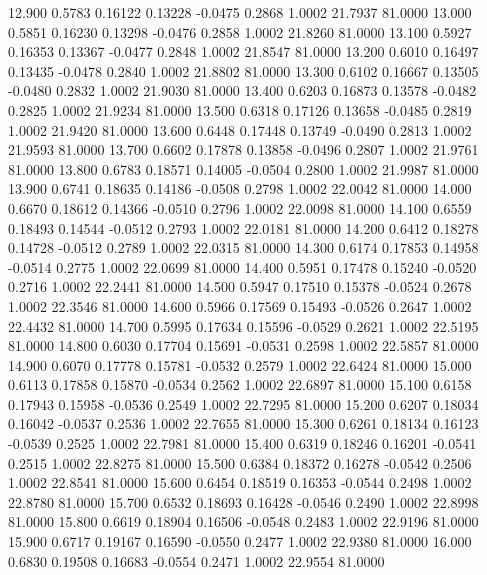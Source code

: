   12.900   0.5783   0.16122   0.13228  -0.0475   0.2868   1.0002  21.7937  81.0000
  13.000   0.5851   0.16230   0.13298  -0.0476   0.2858   1.0002  21.8260  81.0000
  13.100   0.5927   0.16353   0.13367  -0.0477   0.2848   1.0002  21.8547  81.0000
  13.200   0.6010   0.16497   0.13435  -0.0478   0.2840   1.0002  21.8802  81.0000
  13.300   0.6102   0.16667   0.13505  -0.0480   0.2832   1.0002  21.9030  81.0000
  13.400   0.6203   0.16873   0.13578  -0.0482   0.2825   1.0002  21.9234  81.0000
  13.500   0.6318   0.17126   0.13658  -0.0485   0.2819   1.0002  21.9420  81.0000
  13.600   0.6448   0.17448   0.13749  -0.0490   0.2813   1.0002  21.9593  81.0000
  13.700   0.6602   0.17878   0.13858  -0.0496   0.2807   1.0002  21.9761  81.0000
  13.800   0.6783   0.18571   0.14005  -0.0504   0.2800   1.0002  21.9987  81.0000
  13.900   0.6741   0.18635   0.14186  -0.0508   0.2798   1.0002  22.0042  81.0000
  14.000   0.6670   0.18612   0.14366  -0.0510   0.2796   1.0002  22.0098  81.0000
  14.100   0.6559   0.18493   0.14544  -0.0512   0.2793   1.0002  22.0181  81.0000
  14.200   0.6412   0.18278   0.14728  -0.0512   0.2789   1.0002  22.0315  81.0000
  14.300   0.6174   0.17853   0.14958  -0.0514   0.2775   1.0002  22.0699  81.0000
  14.400   0.5951   0.17478   0.15240  -0.0520   0.2716   1.0002  22.2441  81.0000
  14.500   0.5947   0.17510   0.15378  -0.0524   0.2678   1.0002  22.3546  81.0000
  14.600   0.5966   0.17569   0.15493  -0.0526   0.2647   1.0002  22.4432  81.0000
  14.700   0.5995   0.17634   0.15596  -0.0529   0.2621   1.0002  22.5195  81.0000
  14.800   0.6030   0.17704   0.15691  -0.0531   0.2598   1.0002  22.5857  81.0000
  14.900   0.6070   0.17778   0.15781  -0.0532   0.2579   1.0002  22.6424  81.0000
  15.000   0.6113   0.17858   0.15870  -0.0534   0.2562   1.0002  22.6897  81.0000
  15.100   0.6158   0.17943   0.15958  -0.0536   0.2549   1.0002  22.7295  81.0000
  15.200   0.6207   0.18034   0.16042  -0.0537   0.2536   1.0002  22.7655  81.0000
  15.300   0.6261   0.18134   0.16123  -0.0539   0.2525   1.0002  22.7981  81.0000
  15.400   0.6319   0.18246   0.16201  -0.0541   0.2515   1.0002  22.8275  81.0000
  15.500   0.6384   0.18372   0.16278  -0.0542   0.2506   1.0002  22.8541  81.0000
  15.600   0.6454   0.18519   0.16353  -0.0544   0.2498   1.0002  22.8780  81.0000
  15.700   0.6532   0.18693   0.16428  -0.0546   0.2490   1.0002  22.8998  81.0000
  15.800   0.6619   0.18904   0.16506  -0.0548   0.2483   1.0002  22.9196  81.0000
  15.900   0.6717   0.19167   0.16590  -0.0550   0.2477   1.0002  22.9380  81.0000
  16.000   0.6830   0.19508   0.16683  -0.0554   0.2471   1.0002  22.9554  81.0000
